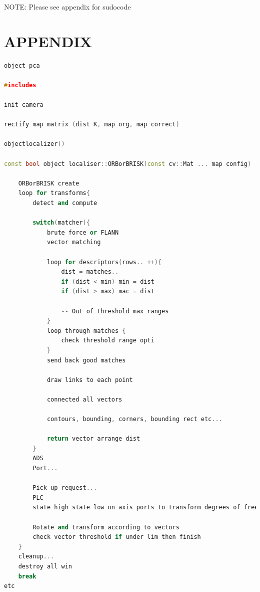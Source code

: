 \documentclass[a4paper, 10pt]{IEEEconf}
\begin{document}
NOTE: Please see appendix for sudocode


\clearpage
\nocite{*}




\onecolumn
\section*{APPENDIX}
\begin{lstlisting}[language = c++]
object pca

#includes

init camera

rectify map matrix (dist K, map org, map correct)

objectlocalizer()

const bool object localiser::ORBorBRISK(const cv::Mat ... map config)
	
	ORBorBRISK create
	loop for transforms{
		detect and compute
	
		switch(matcher){
			brute force or FLANN
			vector matching
			
			loop for descriptors(rows.. ++){
				dist = matches..
				if (dist < min) min = dist
				if (dist > max) mac = dist
			
				-- Out of threshold max ranges
			}
			loop through matches {
				check threshold range opti
			}
			send back good matches
		
			draw links to each point
		
			connected all vectors
		
			contours, bounding, corners, bounding rect etc...
		
			return vector arrange dist
		}
		ADS 
		Port...
	
		Pick up request... 
		PLC
		state high state low on axis ports to transform degrees of freedom
	
		Rotate and transform according to vectors
		check vector threshold if under lim then finish
	}
	cleanup...
	destroy all win
	break	
etc
\end{lstlisting}
\end{document}
